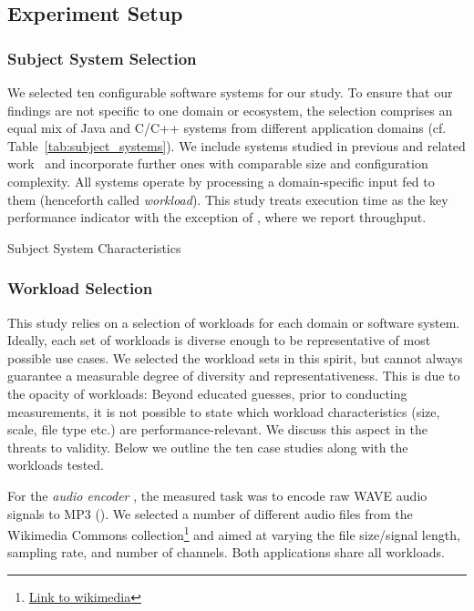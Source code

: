 \subsection{Experiment Setup}\label{sec:setup}
\subsubsection{Subject System Selection}
{\color{edited}
We selected ten configurable software systems for our study. To ensure that our findings are not specific to one domain or ecosystem, the selection comprises an equal mix of Java and C/C++ systems from different application domains (cf. Table~\ref{tab:subject_systems}). We include systems studied in previous and related work~\cite{velez_2020_configcrusher_jase,weber_white_2021,alves_sampling_2020} and incorporate further ones with comparable size and configuration complexity. All systems operate by processing a domain-specific input fed to them (henceforth called \textit{workload}). This study treats execution time as the key performance indicator with the exception of \htwo, where we report throughput.

\begin{table}
	\footnotesize
	\centering
	\caption{Subject System Characteristics}
	
	\label{tab:subject_systems}
\end{table}

\subsubsection{Workload Selection}
This study relies on a selection of workloads for each domain or software system. Ideally, each set of workloads is diverse enough to be representative of most possible use cases. We selected the workload sets in this spirit, but cannot always guarantee a measurable degree of diversity and representativeness. This is due to the opacity of workloads: Beyond educated guesses, prior to conducting measurements, it is not possible to state which workload characteristics (size, scale, file type etc.) are performance-relevant. We discuss this aspect in the threats to validity. Below we outline the ten case studies along with the workloads tested. 


For the \textit{audio encoder} \jumper, the measured task was to encode raw WAVE audio signals to MP3 (\jumper). We selected a number of different audio files from the Wikimedia Commons collection\footnote{\url{Link to wikimedia}} and aimed at varying the file size/signal length, sampling rate, and number of channels. Both applications share all workloads.

}
